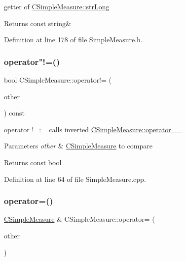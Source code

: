 getter of \hyperlink{classCSimpleMeasure_a5761fb46fb35ce577066ef1e7ec1ab2e}{C\+Simple\+Measure\+::str\+Long} 

\begin{DoxyReturn}{Returns}
const string\& 
\end{DoxyReturn}


Definition at line 178 of file Simple\+Measure.\+h.

\mbox{\label{classCSimpleMeasure_a157b4e0af2843d8fb5c369b92cfd7c1f}} 
\subsubsection{\texorpdfstring{operator"!=()}{operator!=()}}
{\footnotesize\ttfamily bool C\+Simple\+Measure\+::operator!= (\begin{DoxyParamCaption}\item[{const \hyperlink{classCSimpleMeasure}{C\+Simple\+Measure} \&}]{other }\end{DoxyParamCaption}) const}



operator !=\+: ~\newline
 calls inverted \hyperlink{classCSimpleMeasure_aafe9d3871eadf4004a62a8561b883b1e}{C\+Simple\+Measure\+::operator==} 


\begin{DoxyParams}{Parameters}
{\em other} & \hyperlink{classCSimpleMeasure}{C\+Simple\+Measure} to compare \\
\hline
\end{DoxyParams}
\begin{DoxyReturn}{Returns}
const bool 
\end{DoxyReturn}


Definition at line 64 of file Simple\+Measure.\+cpp.

\mbox{\label{classCSimpleMeasure_a8466a492481648fa96a734566f0d6ba5}} 
\subsubsection{\texorpdfstring{operator=()}{operator=()}}
{\footnotesize\ttfamily \hyperlink{classCSimpleMeasure}{C\+Simple\+Measure} \& C\+Simple\+Measure\+::operator= (\begin{DoxyParamCaption}\item[{const \hyperlink{classCSimpleMeasure}{C\+Simple\+Measure} \&}]{other }\end{DoxyParamCaption})}



